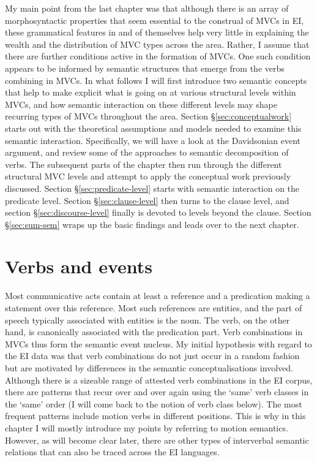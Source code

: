 My main point from the last chapter was that although there is an array of morphosyntactic properties that seem essential to the construal of MVCs in EI, these grammatical features in and of themselves help very little in explaining the wealth and the distribution of MVC types across the area. Rather, I assume that there are further conditions active in the formation of MVCs. One such condition appears to be informed by semantic structures that emerge from the verbs combining in MVCs. In what follows I will first introduce two semantic concepts that  help to make explicit what is going on at various structural levels within MVCs, and how semantic interaction on these different levels may shape recurring types of MVCs throughout the area. Section §\ref{sec:conceptualwork} starts out with the theoretical assumptions and models needed to examine this semantic interaction. Specifically, we will have a look at the Davidsonian event argument, and review some of the approaches to semantic decomposition of verbs. The subsequent parts of the chapter then run through the different structural MVC levels and attempt to apply the conceptual work previously discussed. Section §\ref{sec:predicate-level} starts with semantic interaction on the predicate level. Section §\ref{sec:clause-level} then turns to the clause level, and section §\ref{sec:discourse-level} finally is devoted to levels beyond the clause. Section §\ref{sec:sum-sem} wraps up the basic findings and leads over to the next chapter.

\section{Verbs and events}
\label{sec:verbsevents}

Most communicative acts contain at least a reference and a predication making a statement over this reference. Most such references are entities, and the part of speech typically associated with entities is the noun. The verb, on the other hand, is canonically associated with the predication part. Verb combinations in MVCs thus form the semantic event nucleus. My initial hypothesis with regard to the EI data was that verb combinations do not just occur in a random fashion but are motivated by differences in the semantic conceptualisations involved. Although there is a sizeable range of attested verb combinations in the EI corpus, there are patterns that recur over and over again using the `same' verb classes in the `same' order (I will come back to the notion of verb class below). The most frequent patterns include motion verbs in different positions. This is why in this chapter I will mostly introduce my points by referring to motion semantics. However, as will become clear later, there are other types of interverbal semantic relations that can also be traced across the EI languages. 

